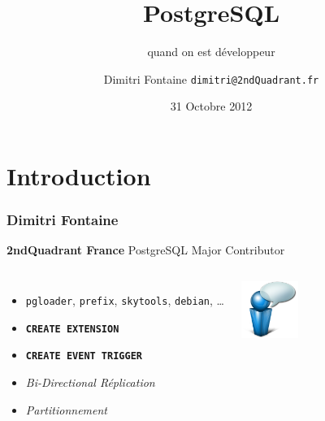 \documentclass{beamer}
\title{PostgreSQL}
\subtitle{quand on est développeur}
\author{Dimitri Fontaine \texttt{dimitri@2ndQuadrant.fr}}
\date{31 Octobre 2012}
\begin{document}
\frame{\titlepage}

\section{Introduction}

\begin{frame}[fragile]
  \frametitle{Dimitri Fontaine}

  \begin{center}
    \textbf{2ndQuadrant France}
    \linebreak
    PostgreSQL Major Contributor
  \end{center}
  \linebreak

\begin{columns}[c]

  \begin{itemize}
   \item<2-> \texttt{pgloader}, \texttt{prefix}, \texttt{skytools}, \texttt{debian}, …
   \item<2-> \texttt{\textbf{CREATE EXTENSION}}
   \item<3-> \texttt{\textbf{CREATE EVENT TRIGGER}}
   \item<3-> \textit{Bi-Directional Réplication}
   \item<4-> \textit{Partitionnement}
  \end{itemize}  

\begin{center}
  \includegraphics[height=5em]{bulle-blue-icon.png}
\end{center}
\end{columns}
\end{frame}
\end{document}
